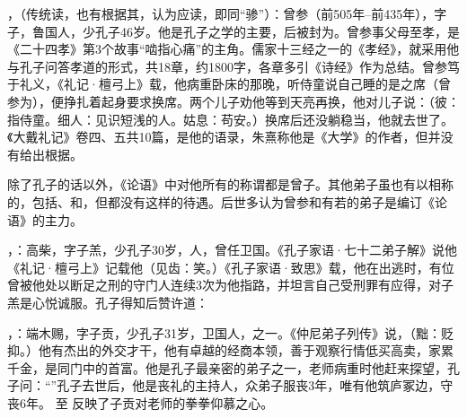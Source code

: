 ，（传统读，也有根据其，认为应读，即同“骖”）：曾参（前505年--前435年），字子，鲁国人，少孔子46岁。他是孔子之学的主要，后被封为。曾参事父母至孝，是《二十四孝》第3个故事“啮指心痛”的主角。儒家十三经之一的《孝经》，就采用他与孔子问答孝道的形式，共18章，约1800字，各章多引《诗经》作为总结。曾参笃于礼义，《礼记·檀弓上》载，他病重卧床的那晚，听侍童说自己睡的是之席（曾参为），便挣扎着起身要求换席。两个儿子劝他等到天亮再换，他对儿子说：（彼：指侍童。细人：见识短浅的人。姑息：苟安。）换席后还没躺稳当，他就去世了。《大戴礼记》卷四、五共10篇，是他的语录，朱熹称他是《大学》的作者，但并没有给出根据。

除了孔子的话以外，《论语》中对他所有的称谓都是曾子。其他弟子虽也有以相称的，包括、和，但都没有这样的待遇。后世多认为曾参和有若的弟子是编订《论语》的主力。%

，：高柴，字子羔，少孔子30岁，人，曾任卫国。《孔子家语·七十二弟子解》说他《礼记·檀弓上》记载他（见齿：笑。）《孔子家语·致思》载，他在出逃时，有位曾被他处以断足之刑的守门人连续3次为他指路，并坦言自己受刑罪有应得，对子羔是心悦诚服。孔子得知后赞许道：

，：端木赐，字子贡，少孔子31岁，卫国人，之一。《仲尼弟子列传》说，（黜：贬抑。）他有杰出的外交才干，他有卓越的经商本领，善于观察行情低买高卖，家累千金，是同门中的首富。他是孔子最亲密的弟子之一，老师病重时他赶来探望，孔子问：“”孔子去世后，他是丧礼的主持人，众弟子服丧3年，唯有他筑庐冢边，守丧6年。 至  反映了子贡对老师的拳拳仰慕之心。

